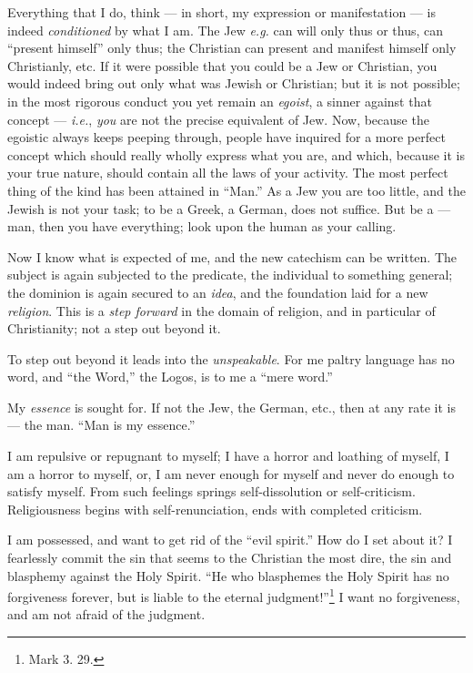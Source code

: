 Everything that I do, think --- in short, my expression or manifestation --- is 
indeed \textit{conditioned} by what I am. The Jew \textit{e.g.} can will only 
thus or thus, can ``present himself'' only thus; the Christian can present 
and manifest himself only Christianly, etc. If it were possible that you could 
be a Jew or Christian, you would indeed bring out only what was Jewish or 
Christian; but it is not possible; in the most rigorous conduct you yet remain 
an \textit{egoist}, a sinner against that concept --- \textit{i.e.}, 
\textit{you} are not the precise equivalent of Jew. Now, because the egoistic 
always keeps peeping through, people have inquired for a more perfect concept 
which should really wholly express what you are, and which, because it is your 
true nature, should contain all the laws of your activity. The most perfect 
thing of the kind has been attained in ``Man.'' As a Jew you are too little, 
and the Jewish is not your task; to be a Greek, a German, does not suffice. 
But be a --- man, then you have everything; look upon the human as your 
calling.

Now I know what is expected of me, and the new catechism can be written. The 
subject is again subjected to the predicate, the individual to something 
general; the dominion is again secured to an \textit{idea}, and the foundation 
laid for a new \textit{religion}. This is a \textit{step forward} in the 
domain of religion, and in particular of Christianity; not a step out beyond 
it.

To step out beyond it leads into the \textit{unspeakable}. For me paltry 
language has no word, and ``the Word,'' the Logos, is to me a ``mere 
word.''

My \textit{essence} is sought for. If not the Jew, the German, etc., then at 
any rate it is --- the man. ``Man is my essence.''

I am repulsive or repugnant to myself; I have a horror and loathing of myself, 
I am a horror to myself, or, I am never enough for myself and never do enough 
to satisfy myself. From such feelings springs self-dissolution or 
self-criticism. Religiousness begins with self-renunciation, ends with 
completed criticism.

I am possessed, and want to get rid of the ``evil spirit.'' How do I set 
about it? I fearlessly commit the sin that seems to the Christian the most 
dire, the sin and blasphemy against the Holy Spirit. ``He who blasphemes the 
Holy Spirit has no forgiveness forever, but is liable to the eternal 
judgment!''\footnote{Mark 3. 29.} I want no forgiveness, and am not afraid of 
the judgment.

